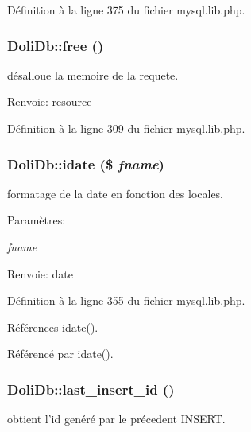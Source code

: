 D\'{e}finition \`{a} la ligne 375 du fichier mysql.lib.php.\hypertarget{classDoliDb_a13}{
\subsubsection[free]{\setlength{\rightskip}{0pt plus 5cm}Doli\-Db::free ()}}
\label{classDoliDb_a13}


d\'{e}salloue la memoire de la requete. 

\begin{Desc}
\item[Renvoie:]resource \end{Desc}


D\'{e}finition \`{a} la ligne 309 du fichier mysql.lib.php.\hypertarget{classDoliDb_a17}{
\subsubsection[idate]{\setlength{\rightskip}{0pt plus 5cm}Doli\-Db::idate (\$ {\em fname})}}
\label{classDoliDb_a17}


formatage de la date en fonction des locales. 

\begin{Desc}
\item[Param\`{e}tres:]
\begin{description}
\item[{\em fname}]\end{description}
\end{Desc}
\begin{Desc}
\item[Renvoie:]date \end{Desc}


D\'{e}finition \`{a} la ligne 355 du fichier mysql.lib.php.

R\'{e}f\'{e}rences idate().

R\'{e}f\'{e}renc\'{e} par idate().\hypertarget{classDoliDb_a25}{
\subsubsection[last\_\-insert\_\-id]{\setlength{\rightskip}{0pt plus 5cm}Doli\-Db::last\_\-insert\_\-id ()}}
\label{classDoliDb_a25}


obtient l'id gen\'{e}r\'{e} par le pr\'{e}cedent INSERT. 

